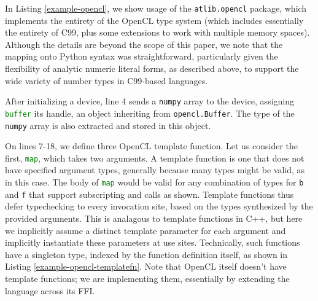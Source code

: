 \documentclass[9pt]{sigplanconf}
\newcommand{\lstinlinep}[1]{\lstinline[language=Python,basicstyle=\ttfamily\small,deletendkeywords={tuple,buffer,map}]{#1}}
\begin{document}
In Listing \ref{example-opencl}, we show usage of the \lstinlinep{atlib.opencl} package, which implements the entirety of the OpenCL type system (which includes essentially the entirety of C99, plus some extensions to work with multiple memory spaces). Although the details are beyond the scope of this paper, we note that the mapping onto Python syntax was straightforward, particularly given the flexibility of analytic numeric literal forms, as described above, to support the wide variety of number types in C99-based languages. 

After initializing a device, line 4 sends a \lstinlinep{numpy} array to the device, assigning \lstinlinep{buffer} its handle, an object inheriting from \lstinlinep{opencl.Buffer}. The type of the \lstinlinep{numpy} array is also extracted and stored in this object.

On lines 7-18, we define three OpenCL template function. Let us consider the first, \lstinlinep{map}, which takes two arguments. A template function is one that does not have specified argument types, generally because many types might be valid, as in this case. The body of \lstinlinep{map} would be valid for any combination of types for \lstinlinep{b} and \lstinlinep{f} that support subscripting and calls as shown. Template functions thus defer typechecking to every invocation site, based on the types synthesized by the provided arguments. This is analagous to template functions in C++, but here we implicitly assume a distinct template parameter for each argument and implicitly instantiate these parameters at use sites. Technically, such functions have a singleton type, indexed by the function definition itself, as shown in Listing \ref{example-opencl-templatefn}. Note that  OpenCL itself doesn't have template functions; we are implementing them, essentially by extending the language across its FFI. 
\end{document}
